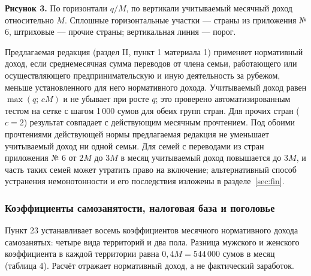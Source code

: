 \documentclass[14pt,a4paper]{extarticle}
\begin{document}
\begin{center}\end{center}
\textbf{Рисунок 3.} По горизонтали $q/M$, по вертикали учитываемый месячный доход относительно $M$. Сплошные горизонтальные участки — страны из приложения № 6, штриховые — прочие страны; вертикальная линия — порог.

Предлагаемая редакция (раздел II, пункт 1 материала 1) применяет нормативный доход, если среднемесячная сумма переводов от члена семьи, работающего или осуществляющего предпринимательскую и иную деятельность за рубежом, меньше установленного для него нормативного дохода. Учитываемый доход равен $\max(q;\,cM)$ и не убывает при росте $q$; это проверено автоматизированным тестом на сетке с шагом 1\,000 сумов для обеих групп стран. Для прочих стран ($c=2$) результат совпадает с действующим месячным прочтением. Под обоими прочтениями действующей нормы предлагаемая редакция не уменьшает учитываемый доход ни одной семьи. Для семей с переводами из стран приложения № 6 от $2M$ до $3M$ в месяц учитываемый доход повышается до $3M$, и часть таких семей может утратить право на включение; альтернативный способ устранения немонотонности и его последствия изложены в разделе~\ref{sec:fin}.

\subsubsection{Коэффициенты самозанятости, налоговая база и поголовье}\label{res:coef}
Пункт 23 устанавливает восемь коэффициентов месячного нормативного дохода самозанятых: четыре вида территорий и два пола. Разница мужского и женского коэффициента в каждой территории равна $0{,}4M=544\,000$ сумов в месяц (таблица 4). Расчёт отражает нормативный доход, а не фактический заработок.
\end{document}

